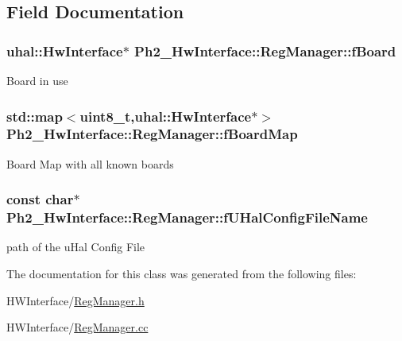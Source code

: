 \subsection{Field Documentation}
\hypertarget{class_ph2___hw_interface_1_1_reg_manager_a0d4908ec834a3a0b7d8139872fd0a4a0}{
\subsubsection[{f\-Board}]{\setlength{\rightskip}{0pt plus 5cm}uhal\-::\-Hw\-Interface$\ast$ Ph2\-\_\-\-Hw\-Interface\-::\-Reg\-Manager\-::f\-Board\hspace{0.3cm}{\ttfamily [protected]}}}\label{class_ph2___hw_interface_1_1_reg_manager_a0d4908ec834a3a0b7d8139872fd0a4a0}
Board in use \hypertarget{class_ph2___hw_interface_1_1_reg_manager_a9c34ffe467a572796c05036533bb6d39}{
\subsubsection[{f\-Board\-Map}]{\setlength{\rightskip}{0pt plus 5cm}std\-::map$<$uint8\-\_\-t,uhal\-::\-Hw\-Interface$\ast$$>$ Ph2\-\_\-\-Hw\-Interface\-::\-Reg\-Manager\-::f\-Board\-Map\hspace{0.3cm}{\ttfamily [protected]}}}\label{class_ph2___hw_interface_1_1_reg_manager_a9c34ffe467a572796c05036533bb6d39}
Board Map with all known boards \hypertarget{class_ph2___hw_interface_1_1_reg_manager_aaaa29ca65c283acc645132c7bef0f24f}{
\subsubsection[{f\-U\-Hal\-Config\-File\-Name}]{\setlength{\rightskip}{0pt plus 5cm}const char$\ast$ Ph2\-\_\-\-Hw\-Interface\-::\-Reg\-Manager\-::f\-U\-Hal\-Config\-File\-Name\hspace{0.3cm}{\ttfamily [protected]}}}\label{class_ph2___hw_interface_1_1_reg_manager_aaaa29ca65c283acc645132c7bef0f24f}
path of the u\-Hal Config File 

The documentation for this class was generated from the following files\-:\begin{DoxyCompactItemize}
\item 
H\-W\-Interface/\hyperlink{_reg_manager_8h}{Reg\-Manager.\-h}\item 
H\-W\-Interface/\hyperlink{_reg_manager_8cc}{Reg\-Manager.\-cc}\end{DoxyCompactItemize}

